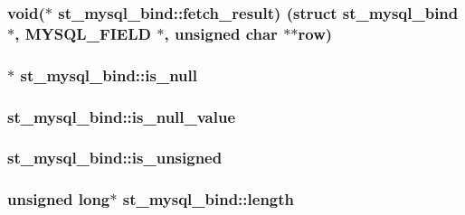 \subsubsection[{fetch\+\_\+result}]{\setlength{\rightskip}{0pt plus 5cm}void($\ast$ st\+\_\+mysql\+\_\+bind\+::fetch\+\_\+result) (struct {\bf st\+\_\+mysql\+\_\+bind} $\ast$, {\bf M\+Y\+S\+Q\+L\+\_\+\+F\+I\+E\+L\+D} $\ast$, unsigned char $\ast$$\ast$row)}\label{structst__mysql__bind_a1398006bc3b49e8a61084188976929ae}
\hypertarget{structst__mysql__bind_a04defa2229677eefb0b50ed902358ef5}{}
\subsubsection[{is\+\_\+null}]{$\ast$ st\+\_\+mysql\+\_\+bind\+::is\+\_\+null}\label{structst__mysql__bind_a04defa2229677eefb0b50ed902358ef5}
\hypertarget{structst__mysql__bind_ae5b4c29062a979ed6039652301015a78}{}
\subsubsection[{is\+\_\+null\+\_\+value}]{ st\+\_\+mysql\+\_\+bind\+::is\+\_\+null\+\_\+value}\label{structst__mysql__bind_ae5b4c29062a979ed6039652301015a78}
\hypertarget{structst__mysql__bind_ae3a058be75cadc4f8219bbba9c322bad}{}
\subsubsection[{is\+\_\+unsigned}]{ st\+\_\+mysql\+\_\+bind\+::is\+\_\+unsigned}\label{structst__mysql__bind_ae3a058be75cadc4f8219bbba9c322bad}
\hypertarget{structst__mysql__bind_a255c7b483665c1d98aaf73606e72cfca}{}
\subsubsection[{length}]{\setlength{\rightskip}{0pt plus 5cm}unsigned long$\ast$ st\+\_\+mysql\+\_\+bind\+::length}\label{structst__mysql__bind_a255c7b483665c1d98aaf73606e72cfca}
\hypertarget{structst__mysql__bind_a3f78eab5d415489c5a0a6cb702974cf2}{}
